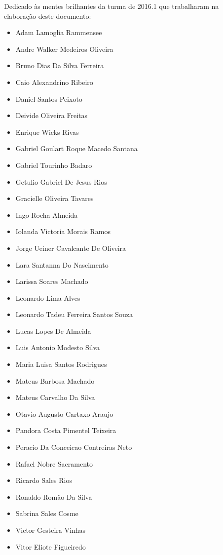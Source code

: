 \begin{dedication}
Dedicado às mentes brilhantes da turma de 2016.1 que trabalharam na elaboração deste documento:

\begin{itemize}
\setlength\itemsep{0em}
\item Adam Lamoglia Rammensee
\item Andre Walker Medeiros Oliveira
\item Bruno Dias Da Silva Ferreira
\item Caio Alexandrino Ribeiro
\item Daniel Santos Peixoto
\item Deivide Oliveira Freitas
\item Enrique Wicks Rivas
\item Gabriel Goulart Roque Macedo Santana
\item Gabriel Tourinho Badaro
\item Getulio Gabriel De Jesus Rios
\item Gracielle Oliveira Tavares
\item Ingo Rocha Almeida
\item Iolanda Victoria Morais Ramos
\item Jorge Ueiner Cavalcante De Oliveira
\item Lara Santanna Do Nascimento
\item Larissa Soares Machado
\item Leonardo Lima Alves
\item Leonardo Tadeu Ferreira Santos Souza
\item Lucas Lopes De Almeida
\item Luis Antonio Modesto Silva
\item Maria Luisa Santos Rodrigues
\item Mateus Barbosa Machado
\item Mateus Carvalho Da Silva
\item Otavio Augusto Cartaxo Araujo
\item Pandora Costa Pimentel Teixeira
\item Peracio Da Conceicao Contreiras Neto
\item Rafael Nobre Sacramento
\item Ricardo Sales Rios
\item Ronaldo Romão Da Silva
\item Sabrina Sales Cosme
\item Victor Gesteira Vinhas
\item Vitor Eliote Figueiredo
\end{itemize}
\end{dedication}